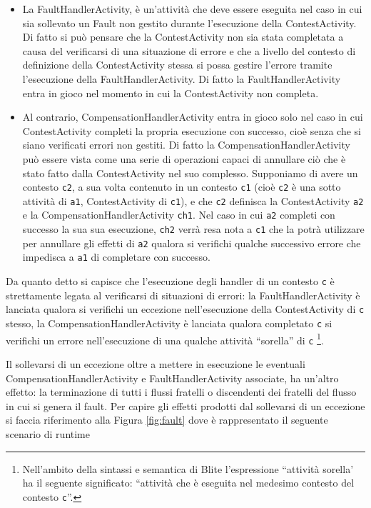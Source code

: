 \begin{itemize}
  \item La FaultHandlerActivity, \`e un'attività che deve essere eseguita nel
  caso in cui sia sollevato un Fault non gestito 
  durante l'esecuzione della ContestActivity. Di fatto si può pensare che la
  ContestActivity non sia stata completata a causa del verificarsi di una 
  situazione di errore e che a livello del contesto di definizione della 
  ContestActivity stessa si possa gestire l'errore tramite l'esecuzione della 
  FaultHandlerActivity. Di fatto la FaultHandlerActivity entra in gioco nel
  momento in cui la ContestActivity non completa.
  
  \item Al contrario, CompensationHandlerActivity entra in gioco solo nel caso
  in cui ContestActivity completi la propria esecuzione con successo, cioè
  senza che si siano verificati errori non gestiti. Di fatto la
  CompensationHandlerActivity può essere vista come una serie di operazioni
  capaci di annullare ciò che \`e stato fatto dalla ContestActivity nel suo
  complesso. 
  Supponiamo di avere un contesto \texttt{c2}, a sua volta
  contenuto in un contesto \texttt{c1} (cioè \texttt{c2} \`e una sotto
  attività di \texttt{a1}, ContestActivity di \texttt{c1}), e che
  \texttt{c2} definisca la ContestActivity \texttt{a2} e la CompensationHandlerActivity
  \texttt{ch1}. Nel caso in cui \texttt{a2} completi con successo la sua
  sua esecuzione, \texttt{ch2} verrà resa nota a \texttt{c1} che la potrà
  utilizzare per annullare gli effetti di \texttt{a2} qualora si verifichi
  qualche successivo errore che impedisca a \texttt{a1} di completare con
  successo.
   
\end{itemize}

Da quanto detto si capisce che l'esecuzione degli handler di un contesto
\texttt{c} \`e strettamente legata al verificarsi di situazioni di errori:
la FaultHandlerActivity \`e lanciata qualora si verifichi un eccezione
nell'esecuzione della ContestActivity di \texttt{c} stesso, la
CompensationHandlerActivity \`e lanciata qualora completato \texttt{c} si
verifichi un errore nell'esecuzione di una qualche attività ``sorella'' di
\texttt{c} \footnote{Nell'ambito della sintassi e semantica di Blite
l'espressione ``attività sorella' ha il seguente significato: ``attività che \`e eseguita
nel medesimo contesto del contesto \texttt{c}''.}.

Il sollevarsi di un eccezione oltre a mettere in esecuzione le eventuali
CompensationHandlerActivity e FaultHandlerActivity associate, ha un'altro
effetto: la terminazione di tutti i flussi fratelli o discendenti dei fratelli
del flusso in cui si genera il fault. Per capire gli effetti prodotti dal
sollevarsi di un eccezione si faccia riferimento alla Figura \ref{fig:fault}
dove \`e rappresentato il seguente scenario di runtime


